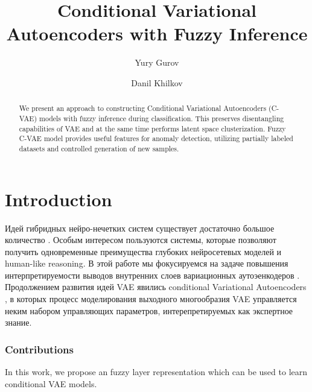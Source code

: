 \documentclass[runningheads]{llncs}
\begin{document}
%
\title{Conditional Variational Autoencoders with Fuzzy Inference}
%
\author{Yury Gurov \and
Danil Khilkov}
%
%
\maketitle              %
%
\begin{abstract}
We present an approach to constructing Conditional Variational Autoencoders (C-VAE) models with fuzzy inference during classification.
This preserves disentangling capabilities of VAE and at the same time performs latent space clusterization.
Fuzzy C-VAE model provides useful features for anomaly detection, utilizing partially labeled datasets and controlled generation of new samples.
%
\end{abstract}
%
%
%
\section{Introduction}

Идей гибридных нейро-нечетких систем существует достаточно большое количество \cite{DECAMPOSSOUZA2020106275}.
Особым интересом пользуются системы, которые позволяют получить одновременные преимущества глубоких нейросетевых моделей и human-like reasoning.
В этой работе мы фокусируемся на задаче повышения интерпретируемости выводов внутренних слоев вариационных аутоэенкодеров \cite{kingma2022autoencoding,Kingma_2019}.
Продолжением развития идей VAE явились conditional Variational Autoencoders \cite{debbagh2023learning}, в которых процесс моделирования выходного многообразия VAE управляется неким набором управляющих параметров, интерепретируемых как экспертное знание.


\subsubsection{Contributions} In this work, we propose an fuzzy layer representation which can be used to learn conditional VAE models.
\end{document}
